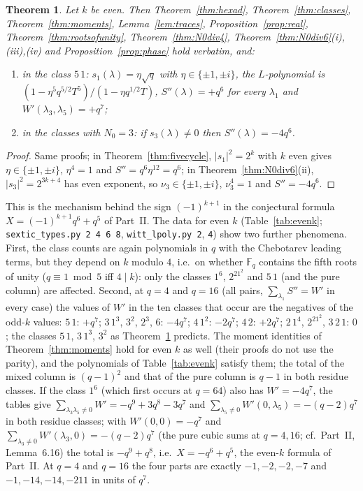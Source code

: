 ﻿\documentclass[12pt,a4paper]{amsart}
\newtheorem{theorem}{Theorem}[section]
\theoremstyle{definition}
\newcommand{\F}{\mathbb{F}}
\newcommand{\Spp}{S''}
\begin{document}
\begin{theorem}\label{thm:evenk}
Let $k$ be even. Then Theorem~\ref{thm:hexad}, Theorem~\ref{thm:classes}, Theorem~\ref{thm:moments}, Lemma~\ref{lem:traces}, Proposition~\ref{prop:real}, Theorem~\ref{thm:rootsofunity}, Theorem~\ref{thm:N0div4}, Theorem~\ref{thm:N0div6}\textup{(i),(iii),(iv)} and Proposition~\ref{prop:phase} hold verbatim, and:
\begin{enumerate}[label=\textup{(\roman*)},leftmargin=2em]
\item in the class $5\,1$: $s_1(\lambda)=\eta\sqrt q$ with $\eta\in\{\pm1,\pm i\}$, the $L$-polynomial is $(1-\eta^5q^{5/2}T^5)/(1-\eta q^{1/2}T)$, $\Spp(\lambda)=+q^6$ for every $\lambda_1$ and $W'(\lambda_3,\lambda_5)=+q^7$;
\item in the classes with $N_0=3$: if $s_3(\lambda)\ne0$ then $\Spp(\lambda)=-4q^6$.
\end{enumerate}
\end{theorem}
\begin{proof}
Same proofs; in Theorem~\ref{thm:fivecycle}, $|s_1|^2=2^k$ with $k$ even gives $\eta\in\{\pm1,\pm i\}$, $\eta^4=1$ and $\Spp=q^6\eta^{12}=q^6$; in Theorem~\ref{thm:N0div6}(ii), $|s_3|^2=2^{3k+4}$ has even exponent, so $\nu_3\in\{\pm1,\pm i\}$, $\nu_3^4=1$ and $\Spp=-4q^6$.
\end{proof}

This is the mechanism behind the sign $(-1)^{k+1}$ in the conjectural formula $X=(-1)^{k+1}q^6+q^5$ of Part~II. The data for even $k$ (Table~\ref{tab:evenk}; \texttt{sextic\_types.py 2 4 6 8}, \texttt{witt\_lpoly.py 2}, \texttt{4}) show two further phenomena. First, the class counts are again polynomials in $q$ with the Chebotarev leading terms, but they depend on $k$ modulo $4$, i.e.\ on whether $\F_q$ contains the fifth roots of unity ($q\equiv1\bmod5$ iff $4\mid k$): only the classes $1^6$, $2^21^2$ and $5\,1$ (and the pure column) are affected. Second, at $q=4$ and $q=16$ (all pairs, $\sum_{\lambda_1}\Spp=W'$ in every case) the values of $W'$ in the ten classes that occur are the negatives of the odd-$k$ values: $5\,1$: $+q^7$; $3\,1^3$, $3^2$, $2^3$, $6$: $-4q^7$; $4\,1^2$: $-2q^7$; $4\,2$: $+2q^7$; $2\,1^4$, $2^21^2$, $3\,2\,1$: $0$; the classes $5\,1$, $3\,1^3$, $3^2$ as Theorem~\ref{thm:evenk} predicts. The moment identities of Theorem~\ref{thm:moments} hold for even $k$ as well (their proofs do not use the parity), and the polynomials of Table~\ref{tab:evenk} satisfy them; the total of the mixed column is $(q-1)^2$ and that of the pure column is $q-1$ in both residue classes. If the class $1^6$ (which first occurs at $q=64$) also has $W'=-4q^7$, the tables give $\sum_{\lambda_3\lambda_5\ne0}W'=-q^9+3q^8-3q^7$ and $\sum_{\lambda_5\ne0}W'(0,\lambda_5)=-(q-2)q^7$ in both residue classes; with $W'(0,0)=-q^7$ and $\sum_{\lambda_3\ne0}W'(\lambda_3,0)=-(q-2)q^7$ (the pure cubic sums at $q=4,16$; cf.\ Part~II, Lemma~6.16) the total is $-q^9+q^8$, i.e.\ $X=-q^6+q^5$, the even-$k$ formula of Part~II. At $q=4$ and $q=16$ the four parts are exactly $-1,-2,-2,-7$ and $-1,-14,-14,-211$ in units of $q^7$.
\end{document}
